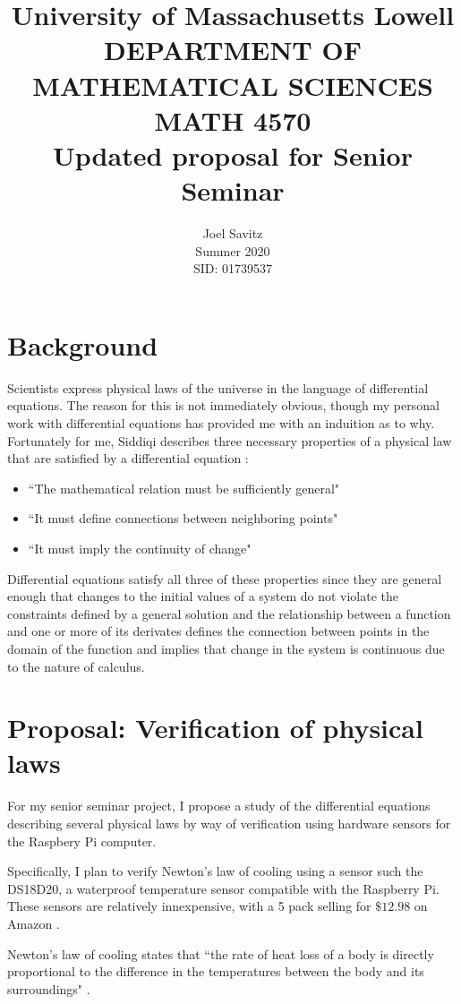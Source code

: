 \documentclass[12pt]{amsart}
\title{ University of Massachusetts Lowell \protect\\
	DEPARTMENT OF MATHEMATICAL SCIENCES \protect\\
MATH 4570 \protect\\
Updated proposal for Senior Seminar}
\author{Joel Savitz \\ Summer  2020 \\ SID: 01739537}
\begin{document}
\maketitle

\section{Background}

Scientists express physical laws of
the universe in the language of differential equations.
The reason for this is not immediately obvious,
though my personal work with differential equations
has provided me with an induition as to why.
Fortunately for me,
Siddiqi describes three necessary properties
of a physical law that are satisfied by a differential equation \cite{whydiffeq}:


\begin{itemize}
	\item ``The mathematical relation must be sufficiently general"
	\item ``It must define connections between neighboring points"
	\item ``It must imply the continuity of change"
\end{itemize}

Differential equations satisfy all three of these properties
since they are general enough that
changes to the initial values of a system
do not violate the constraints defined by a general solution
and the relationship between a function and one or more of its derivates
defines the connection between points in the domain of the function
and implies that change in the system is continuous
due to the nature of calculus.

\section{Proposal: Verification of physical laws}

For my senior seminar project,
I propose a study of
the differential equations describing several physical laws
by way of verification
using hardware sensors
for the Raspbery Pi computer.

Specifically, I plan to verify Newton's law of cooling
using a sensor such the DS18D20,
a waterproof temperature sensor compatible with the Raspberry Pi.
These sensors are relatively innexpensive,
with a 5 pack selling for $\$12.98$ on Amazon \cite{Amazon}.

Newton's law of cooling states that
``the rate of heat loss of a body is
directly proportional to the difference
in the temperatures between the body and
its surroundings" \cite{wiki}.
\end{document}
